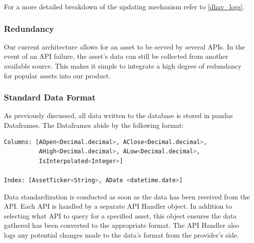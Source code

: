 \documentclass[main.tex]{subfiles}
\begin{document}
For a more detailed breakdown of the updating mechanism refer to \ref{dhav_logs}.


\subsubsection{Redundancy}

Our current architecture allows for an asset to be served by several APIs. In the event of an API failure, the asset's data can still be collected from another available source. This makes it simple to integrate a high degree of redundancy for popular assets into our product. 


\subsubsection{Standard Data Format}
As previously discussed, all data written to the database is stored in pandas Dataframes. The Dataframes abide by the following format:

\begin{lstlisting}[language=Python, caption= Pandas Data Frame Format]
Columns: [AOpen<Decimal.decimal>, AClose<Decimal.decimal>,
          AHigh<Decimal.decimal>, ALow<Decimal.decimal>,
          IsInterpolated<Integer>] 
          
Index: [AssetTicker<String>, ADate <datetime.date>]
\end{lstlisting}

Data standardization is conducted as soon as the data has been received from the API. Each API is handled by a separate API Handler object. In addition to selecting what API to query for a specified asset, this object ensures the data gathered has been converted to the appropriate format. The API Handler also logs any potential changes made to the data's format from the provider's side.
\end{document}
